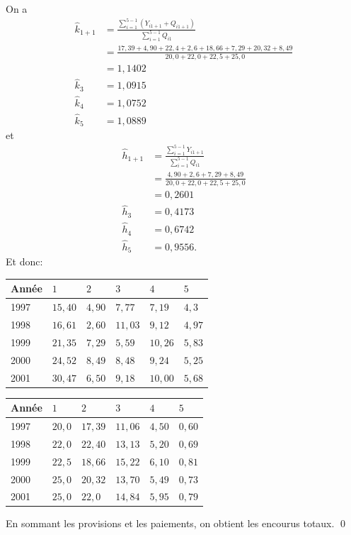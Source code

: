 \begin{exemple}
  On a
  \begin{align*}
    \hat{k}_{1+1}
    &= \frac{\sum_{i=1}^{5-1} \left( Y_{i 1+1} + Q_{i 1+1} \right)}{\sum_{i=1}^{5-1} Q_{i 1}} \\
    &= \frac{17,39+4,90+22,4+2,6+18,66+7,29+20,32+8,49}{20,0+22,0+22,5+25,0} \\
    &= 1,1402\\
    \hat{k}_{3} &= 1,0915\\
    \hat{k}_{4} &= 1,0752\\
    \hat{k}_{5} &= 1,0889
  \end{align*}
  et
  \begin{align*}
    \hat{h}_{1+1}
    &= \frac{\sum_{i=1}^{5-1} Y_{i 1+1}}{\sum_{i=1}^{5-1} Q_{i 1}} \\
    &= \frac{4,90+2,6+7,29+8,49}{20,0+22,0+22,5+25,0} \\
    &= 0,2601 \\
    \hat{h}_{3} &= 0,4173\\
    \hat{h}_{4} &= 0,6742\\
    \hat{h}_{5} &= 0,9556.
  \end{align*}
  Et donc:
  \begin{center}
    \begin{tabular}{|l|l l l l l|}\hline
      Année & $1$ & $2$ & $3$ & $4$ & $5$  \\ \hline
      1997 &$15,40$& $4,90$& $7,77$& $7,19$& $4,3$\\
      1998 &$16,61$& $2,60$& $11,03$& $9,12$& $4,97$\\
      1999 &$21,35$& $7,29$& $5,59$& $10,26$& $5,83$\\
      2000 &$24,52$& $8,49$& $8,48$& $9,24$ &$5,25$\\
      2001 &$30,47$& $6,50$& $9,18$& $10,00$&$5,68$\\ \hline
    \end{tabular}
  \end{center}

  \begin{center}
    \begin{tabular}{|l|l l l l l|}\hline
      Année & $1$ & $2$ & $3$ & $4$ & $5$  \\ \hline
      1997 &$20,0$& $17,39$& $11,06$& $4,50$& $0,60$ \\
      1998 &$22,0$& $22,40$& $13,13$& $5,20$& $0,69$\\
      1999 &$22,5$& $18,66$& $15,22$& $6,10$& $0,81$\\
      2000 &$25,0$& $20,32$& $13,70$& $5,49$& $0,73$\\
      2001 &$25,0$& $22,0$ & $14,84$& $5,95$& $0,79$\\ \hline
    \end{tabular}
  \end{center}
  En sommant les provisions et les paiements, on obtient les encourus
  totaux. %
  \qed
\end{exemple}



